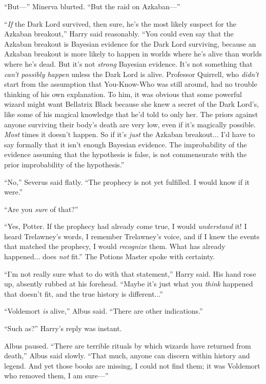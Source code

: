 “But—” Minerva blurted. “But the raid on Azkaban—”

“\emph{If} the Dark Lord survived, then sure, he’s the most likely suspect for the Azkaban breakout,” Harry said reasonably. “You could even say that the Azkaban breakout is Bayesian evidence for the Dark Lord surviving, because an Azkaban breakout is more likely to happen in worlds where he’s alive than worlds where he’s dead. But it’s not \emph{strong} Bayesian evidence. It’s not something that \emph{can’t possibly happen} unless the Dark Lord is alive. Professor Quirrell, who \emph{didn’t} start from the assumption that You-Know-Who was still around, had no trouble thinking of his own explanation. To him, it was obvious that some powerful wizard might want Bellatrix Black because she knew a secret of the Dark Lord’s, like some of his magical knowledge that he’d told to only her. The priors against anyone surviving their body’s death are very low, even if it’s magically possible. \emph{Most} times it doesn’t happen. So if it’s \emph{just} the Azkaban breakout... I’d have to say formally that it isn’t enough Bayesian evidence. The improbability of the evidence assuming that the hypothesis is false, is not commensurate with the prior improbability of the hypothesis.”

“No,” Severus said flatly. “The prophecy is not yet fulfilled. I would know if it were.”

“Are you \emph{sure} of that?”

“Yes, Potter. If the prophecy had already come true, I would \emph{understand} it! I heard Trelawney’s words, I remember Trelawney’s voice, and if I knew the events that matched the prophecy, I would \emph{recognize} them. What has already happened... does \emph{not} fit.” The Potions Master spoke with certainty.

“I’m not really sure what to do with that statement,” Harry said. His hand rose up, absently rubbed at his forehead. “Maybe it’s just what you \emph{think} happened that doesn’t fit, and the true history is different...”

“Voldemort \emph{is} alive,” Albus said. “There are other indications.”

“Such as?” Harry’s reply was instant.

Albus paused. “There are terrible rituals by which wizards have returned from death,” Albus said slowly. “That much, anyone can discern within history and legend. And yet those books are missing, I could not find them; it was Voldemort who removed them, I am sure—”

